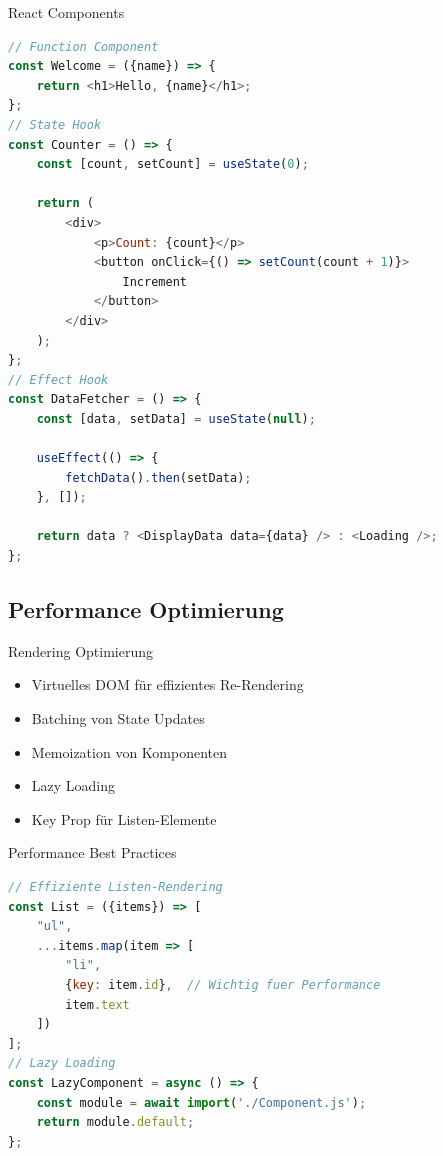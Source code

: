 \begin{KR}{React Components}
\begin{lstlisting}[language=JavaScript, style=basesmol]
// Function Component
const Welcome = ({name}) => {
    return <h1>Hello, {name}</h1>;
};
// State Hook
const Counter = () => {
    const [count, setCount] = useState(0);
    
    return (
        <div>
            <p>Count: {count}</p>
            <button onClick={() => setCount(count + 1)}>
                Increment
            </button>
        </div>
    );
};
// Effect Hook
const DataFetcher = () => {
    const [data, setData] = useState(null);
    
    useEffect(() => {
        fetchData().then(setData);
    }, []);
    
    return data ? <DisplayData data={data} /> : <Loading />;
};
\end{lstlisting}
\end{KR}

\subsection{Performance Optimierung}

\begin{concept}{Rendering Optimierung}
    \begin{itemize}
        \item Virtuelles DOM für effizientes Re-Rendering
        \item Batching von State Updates
        \item Memoization von Komponenten
        \item Lazy Loading
        \item Key Prop für Listen-Elemente
    \end{itemize}
\end{concept}

\begin{KR}{Performance Best Practices}
\begin{lstlisting}[language=JavaScript, style=basesmol]
// Effiziente Listen-Rendering
const List = ({items}) => [
    "ul",
    ...items.map(item => [
        "li",
        {key: item.id},  // Wichtig fuer Performance
        item.text
    ])
];
// Lazy Loading
const LazyComponent = async () => {
    const module = await import('./Component.js');
    return module.default;
};
\end{lstlisting}
\end{KR}